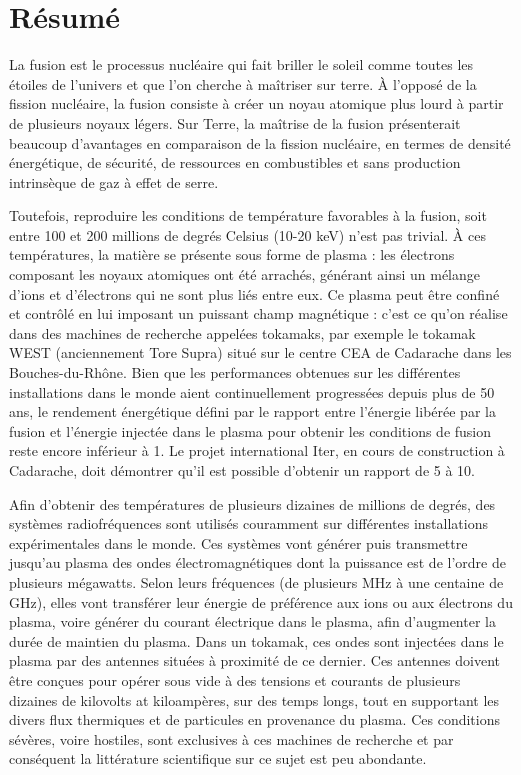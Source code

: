 \chapter*{Résumé}

La fusion est le processus nucléaire qui fait briller le soleil comme toutes les étoiles de l'univers et que l'on cherche à maîtriser sur terre. À l’opposé de la fission nucléaire, la fusion consiste à créer un noyau atomique plus lourd à partir de plusieurs noyaux légers. Sur Terre, la maîtrise de la fusion présenterait beaucoup d’avantages en comparaison de la fission nucléaire, en termes de densité énergétique, de sécurité, de ressources en combustibles et sans production intrinsèque de gaz à effet de serre. 

Toutefois, reproduire les conditions de température favorables à la fusion, soit entre 100 et 200 millions de degrés Celsius (10-20 keV) n’est pas trivial. À ces températures, la matière se présente sous forme de plasma : les électrons composant les noyaux atomiques ont été arrachés, générant ainsi un mélange d’ions et d’électrons qui ne sont plus liés entre eux. Ce plasma peut être confiné et contrôlé en lui imposant un puissant champ magnétique : c’est ce qu’on réalise dans des machines de recherche appelées tokamaks, par exemple le tokamak WEST (anciennement Tore Supra) situé sur le centre CEA de Cadarache dans les Bouches-du-Rhône. Bien que les performances obtenues sur les différentes installations dans le monde aient continuellement progressées depuis plus de 50 ans, le rendement énergétique défini par le rapport entre l'énergie libérée par la fusion et l'énergie injectée dans le plasma pour obtenir les conditions de fusion reste encore inférieur à 1. Le projet international Iter, en cours de construction à Cadarache, doit démontrer qu'il est possible d'obtenir un rapport de 5 à 10.

Afin d'obtenir des températures de plusieurs dizaines de millions de degrés, des systèmes radiofréquences sont utilisés couramment sur différentes installations expérimentales dans le monde. Ces systèmes vont générer puis transmettre jusqu'au plasma des ondes électromagnétiques dont la puissance est de l'ordre de plusieurs mégawatts. Selon leurs fréquences (de plusieurs MHz à une centaine de GHz), elles vont transférer leur énergie de préférence aux ions ou aux électrons du plasma, voire générer du courant électrique dans le plasma, afin d'augmenter la durée de maintien du plasma. Dans un tokamak, ces ondes sont injectées dans le plasma par des antennes situées à proximité de ce dernier. Ces antennes doivent être conçues pour opérer sous vide à des tensions et courants de plusieurs dizaines de kilovolts at kiloampères, sur des temps longs, tout en supportant les divers flux thermiques et de particules en provenance du plasma. Ces conditions sévères, voire hostiles, sont exclusives à ces machines de recherche et par conséquent la littérature scientifique sur ce sujet est peu abondante.

